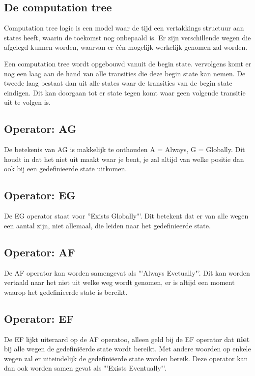 \documentclass{article}%
\begin{document}
\subsection{De computation tree}
Computation tree logic is een model waar de tijd een vertakkings structuur aan states heeft, waarin de toekomst nog onbepaald is. Er zijn verschillende wegen die afgelegd kunnen worden, waarvan er één mogelijk werkelijk genomen zal worden.

Een computation tree wordt opgebouwd vanuit de begin state. vervolgens komt er nog een laag aan de hand van alle transities die deze begin state kan nemen. De tweede laag bestaat dan uit alle states waar de transities van de begin state eindigen. Dit kan doorgaan tot er state tegen komt waar geen volgende transitie uit te volgen is.

\subsection{Operator: AG}
De betekenis van AG is makkelijk te onthouden A = Always, G = Globally. Dit houdt in dat het niet uit maakt waar je bent, je zal altijd van welke positie dan ook bij een gedefinieerde state uitkomen.

\subsection{Operator: EG}
De EG operator staat voor ''Exists Globally"'. Dit betekent dat er van alle wegen een aantal zijn, niet allemaal, die leiden naar het gedefinieerde state. 

\subsection{Operator: AF}
De AF operator kan worden samengevat als "'Always Evetually"'. Dit kan worden vertaald naar het niet uit welke weg wordt genomen, er is altijd een moment waarop het gedefinieerde state is bereikt.

\subsection{Operator: EF}
De EF lijkt uiteraard op de AF operatoo, alleen geld bij de EF operator dat \textbf{niet} bij alle wegen de gedefiniëerde state wordt bereikt. Met andere woorden op enkele wegen zal er uiteindelijk de gedefiniëerde state worden bereik. Deze operator kan dan ook worden samen gevat als "'Exists Eventually"'.
\end{document}

